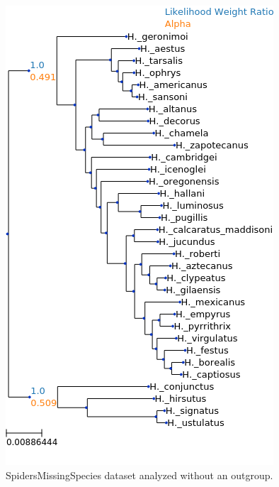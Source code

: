 \documentclass{article}
\begin{document}
\begin{figure}
  \begin{center}
    \includegraphics[width=.75\linewidth]{figs/spiders/missing_species_no_outgroup_lwr.png}
    \caption{SpidersMissingSpecies dataset analyzed without an outgroup.}
    \label{fig:spiders-missing-species-no-outgroup}
  \end{center}
\end{figure}
\end{document}
